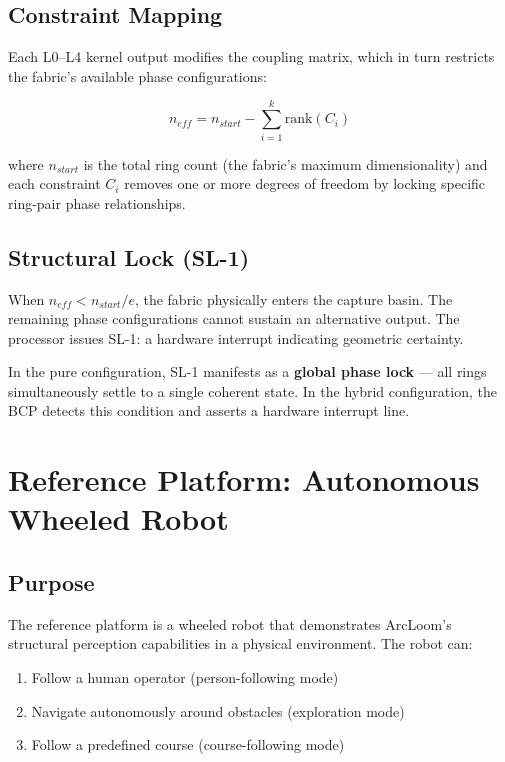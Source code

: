 \documentclass[11pt, a4paper]{article}
\begin{document}
\subsection{Constraint Mapping}

Each L0--L4 kernel output modifies the coupling matrix, which in turn
restricts the fabric's available phase configurations:

\begin{equation}
  n_{eff} = n_{start} - \sum_{i=1}^{k} \text{rank}(C_i)
\end{equation}

where $n_{start}$ is the total ring count (the fabric's maximum
dimensionality) and each constraint $C_i$ removes one or more degrees
of freedom by locking specific ring-pair phase relationships.

\subsection{Structural Lock (SL-1)}

When $n_{eff} < n_{start}/e$, the fabric physically enters the capture
basin. The remaining phase configurations cannot sustain an alternative
output. The processor issues SL-1: a hardware interrupt indicating
geometric certainty.

In the pure configuration, SL-1 manifests as a \textbf{global phase lock}
--- all rings simultaneously settle to a single coherent state. In the
hybrid configuration, the BCP detects this condition and asserts a
hardware interrupt line.

\section{Reference Platform: Autonomous Wheeled Robot}

\subsection{Purpose}

The reference platform is a wheeled robot that demonstrates ArcLoom's
structural perception capabilities in a physical environment. The robot
can:
\begin{enumerate}[nosep]
  \item Follow a human operator (person-following mode)
  \item Navigate autonomously around obstacles (exploration mode)
  \item Follow a predefined course (course-following mode)
\end{enumerate}
\end{document}
